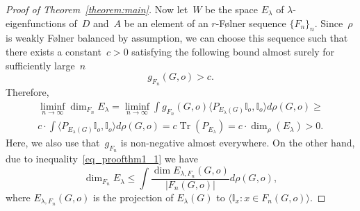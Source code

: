 \documentclass[10pt,a4paper]{amsart}
\DeclareMathOperator{\Tr}{Tr} %
\begin{document}
\begin{proof}[Proof of Theorem~\ref{theorem:main}]
    Now let~$W$ be the space $E_\lambda$ of $\lambda$-eigenfunctions of~$D$ and~$A$ be an element of an $r$-F\o lner sequence $\{F_n\}_n$.
    Since~$\rho$ is weakly {F\o lner} balanced by assumption, we can choose this sequence such that there exists a constant~$c > 0$ satisfying the following bound almost surely for sufficiently large~$n$
    \begin{equation}\label{eq_proof1}
        g_{F_n}(G,o) > c.
    \end{equation}
    Therefore,
    \begin{multline}\label{eq_proof2}
        \liminf_{n \to \infty} \dim_{F_n} E_\lambda = 
        \liminf_{n \to \infty} \int g_{F_n}(G,o) \langle P_{E_\lambda(G)}\mathbb I_o, \mathbb I_o\rangle d \rho(G,o) \ge \\
        c \cdot \int \langle P_{E_\lambda(G)}\mathbb I_o, \mathbb I_o\rangle d \rho(G,o) = c \Tr(P_{E_\lambda}) = c \cdot \dim_\rho (E_\lambda) > 0.
    \end{multline}
    Here, we also use that~$g_{F_n}$ is non-negative almost everywhere. On the other hand, due to inequality~\eqref{eq_proofthm1_1} we have 
    \begin{equation}\label{eq_finproj}
        \dim_{F_n} E_\lambda \le 
        \int \frac{\dim {E_{\lambda,F_n}}(G,o)}{|F_n(G,o)|} d \rho (G,o),
    \end{equation}
    where $E_{\lambda, F_n}(G,o)$ is the projection of $E_\lambda(G)$ to $\langle \mathbb I_x \colon x\in F_n(G,o)\rangle$. 


\end{proof}
\end{document}
